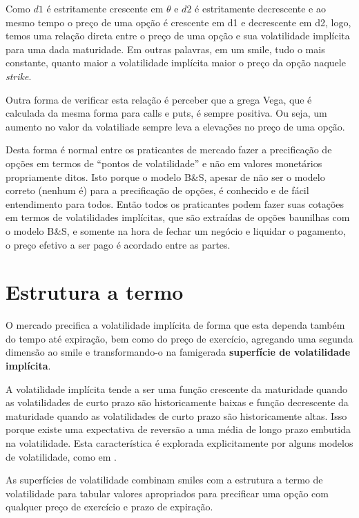 \documentclass[]{book}
\theoremstyle{definition}
\theoremstyle{definition}
\theoremstyle{definition}
\theoremstyle{remark}
\begin{document}
Como \(d1\) é estritamente crescente em \(\theta\) e \(d2\) é
estritamente decrescente e ao mesmo tempo o preço de uma opção é
crescente em d1 e decrescente em d2, logo, temos uma relação direta
entre o preço de uma opção e sua volatilidade implícita para uma dada
maturidade. Em outras palavras, em um smile, tudo o mais constante,
quanto maior a volatilidade implícita maior o preço da opção naquele
\emph{strike}.

Outra forma de verificar esta relação é perceber que a grega Vega, que é
calculada da mesma forma para calls e puts, é sempre positiva. Ou seja,
um aumento no valor da volatiliade sempre leva a elevações no preço de
uma opção.

Desta forma é normal entre os praticantes de mercado fazer a
precificação de opções em termos de ``pontos de volatilidade'' e não em
valores monetários propriamente ditos. Isto porque o modelo B\&S, apesar
de não ser o modelo correto (nenhum é) para a precificação de opções, é
conhecido e de fácil entendimento para todos. Então todos os praticantes
podem fazer suas cotações em termos de volatilidades implícitas, que são
extraídas de opções baunilhas com o modelo B\&S, e somente na hora de
fechar um negócio e liquidar o pagamento, o preço efetivo a ser pago é
acordado entre as partes.

\section{Estrutura a termo}\label{estrutura-a-termo}

O mercado precifica a volatilidade implícita de forma que esta dependa
também do tempo até expiração, bem como do preço de exercício, agregando
uma segunda dimensão ao smile e transformando-o na famigerada
\textbf{superfície de volatilidade implícita}.

A volatilidade implícita tende a ser uma função crescente da maturidade
quando as volatilidades de curto prazo são historicamente baixas e
função decrescente da maturidade quando as volatilidades de curto prazo
são historicamente altas. Isso porque existe uma expectativa de reversão
a uma média de longo prazo embutida na volatilidade. Esta característica
é explorada explicitamente por alguns modelos de volatilidade, como em
\citet{Heston1993}.

As superfícies de volatilidade combinam smiles com a estrutura a termo
de volatilidade para tabular valores apropriados para precificar uma
opção com qualquer preço de exercício e prazo de expiração.
\end{document}
